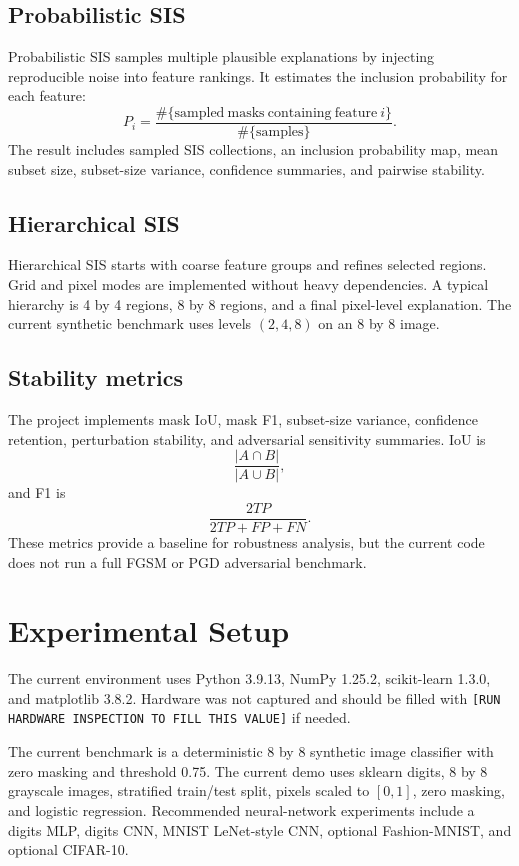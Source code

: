 \documentclass[11pt]{article}
\begin{document}
\subsection{Probabilistic SIS}
Probabilistic SIS samples multiple plausible explanations by injecting reproducible noise into feature rankings. It estimates the inclusion probability for each feature:
\[
P_i = \frac{\#\{\mathrm{sampled\ masks\ containing\ feature}\ i\}}{\#\{\mathrm{samples}\}}.
\]
The result includes sampled SIS collections, an inclusion probability map, mean subset size, subset-size variance, confidence summaries, and pairwise stability.

\subsection{Hierarchical SIS}
Hierarchical SIS starts with coarse feature groups and refines selected regions. Grid and pixel modes are implemented without heavy dependencies. A typical hierarchy is 4 by 4 regions, 8 by 8 regions, and a final pixel-level explanation. The current synthetic benchmark uses levels $(2,4,8)$ on an 8 by 8 image.

\subsection{Stability metrics}
The project implements mask IoU, mask F1, subset-size variance, confidence retention, perturbation stability, and adversarial sensitivity summaries. IoU is
\[
\frac{|A \cap B|}{|A \cup B|},
\]
and F1 is
\[
\frac{2TP}{2TP + FP + FN}.
\]
These metrics provide a baseline for robustness analysis, but the current code does not run a full FGSM or PGD adversarial benchmark.

\section{Experimental Setup}
The current environment uses Python 3.9.13, NumPy 1.25.2, scikit-learn 1.3.0, and matplotlib 3.8.2. Hardware was not captured and should be filled with \texttt{[RUN HARDWARE INSPECTION TO FILL THIS VALUE]} if needed.

The current benchmark is a deterministic 8 by 8 synthetic image classifier with zero masking and threshold 0.75. The current demo uses sklearn digits, 8 by 8 grayscale images, stratified train/test split, pixels scaled to $[0,1]$, zero masking, and logistic regression. Recommended neural-network experiments include a digits MLP, digits CNN, MNIST LeNet-style CNN, optional Fashion-MNIST, and optional CIFAR-10.
\end{document}
